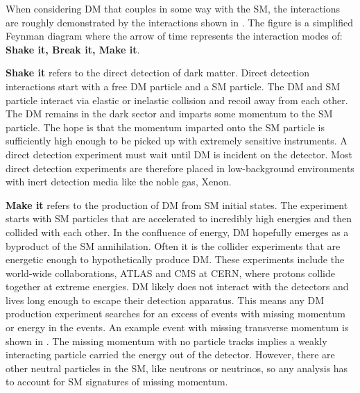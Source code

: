 When considering DM that couples in some way with the SM, the interactions are roughly demonstrated by the interactions shown in .
The figure is a simplified Feynman diagram where the arrow of time represents the interaction modes of: \textbf{Shake it, Break it, Make it}.

\textbf{Shake it} refers to the direct detection of dark matter.
Direct detection interactions start with a free DM particle and a SM particle.
The DM and SM particle interact via elastic or inelastic collision and recoil away from each other.
The DM remains in the dark sector and imparts some momentum to the SM particle.
The hope is that the momentum imparted onto the SM particle is sufficiently high enough to be picked up with extremely sensitive instruments.
A direct detection experiment must wait until DM is incident on the detector.
Most direct detection experiments are therefore placed in low-background environments with inert detection media like the noble gas, Xenon. \cite{Cooley:dd_dm}

\textbf{Make it} refers to the production of DM from SM initial states.
The experiment starts with SM particles that are accelerated to incredibly high energies and then collided with each other.
In the confluence of energy, DM hopefully emerges as a byproduct of the SM annihilation.
Often it is the collider experiments that are energetic enough to hypothetically produce DM.
These experiments include the world-wide collaborations, ATLAS and CMS at CERN, where protons collide together at extreme energies.
DM likely does not interact with the detectors and lives long enough to escape their detection apparatus.
This means any DM production experiment searches for an excess of events with missing momentum or energy in the events.
An example event with missing transverse momentum is shown in .
The missing momentum with no particle tracks implies a weakly interacting particle carried the energy out of the detector.
However, there are other neutral particles in the SM, like neutrons or neutrinos, so any analysis has to account for SM signatures of missing momentum. \cite{atlas:met_dm_precise}

